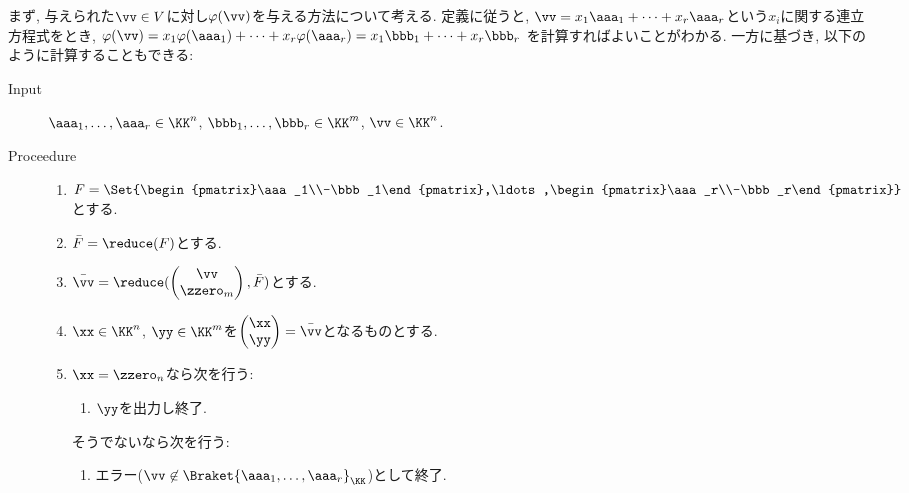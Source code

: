 まず, 与えられた$\vv\in V$に対し$\varphi(\vv)$を与える方法について考える.
定義に従うと,
$\vv=x_1\aaa_1+\cdots+x_r\aaa_r$という$x_i$に関する連立方程式をとき,
$\varphi(\vv)=x_1\varphi(\aaa_1)+\cdots+x_r\varphi(\aaa_r)=x_1\bbb_1+\cdots+x_r\bbb_r$
を計算すればよいことがわかる.
一方に基づき,
以下のように計算することもできる:
\begin{algorithm}\makebox{}
\begin{description}
\item[Input]
$\aaa_1,\ldots,\aaa_r\in \KK^n$,
$\bbb_1,\ldots,\bbb_r\in \KK^m$,
$\vv\in \KK^n$.
\item[Proceedure]\makebox{}
  \begin{enumerate}
  \item $F=\Set{\begin{pmatrix}\aaa_1\\-\bbb_1\end{pmatrix},\ldots,\begin{pmatrix}\aaa_r\\-\bbb_r\end{pmatrix}}$とする.
  \item $\bar F=\reduce(F)$とする.
  \item $\bar \vv=\reduce(\begin{pmatrix}\vv\\\zzero_m\end{pmatrix},\bar F)$とする.
  \item $\xx\in\KK^n$, $\yy\in\KK^m$を$\begin{pmatrix}\xx\\\yy\end{pmatrix}=\bar \vv$となるものとする.
  \item
    $\xx= \zzero_n$なら次を行う:
    \begin{enumerate}
    \item $\yy$を出力し終了.
    \end{enumerate}
    そうでないなら次を行う:
    \begin{enumerate}
    \item エラー($\vv\not\in\Braket{\aaa_1,\ldots,\aaa_r}_{\KK}$)として終了.
    \end{enumerate}
  \end{enumerate}
\end{description}
\end{algorithm}


